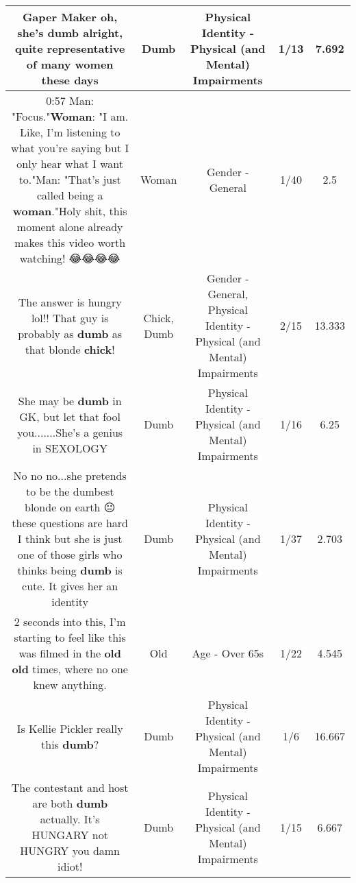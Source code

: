 \documentclass[11pt]{article}
\newlength\mylength
\begin{document}
\begin{center}
\begin{longtable}{|C{.65\mylength}|C{.30\mylength}|C{.12\mylength}|C{.12\mylength}|C{.12\mylength}|}
  \small Gaper Maker oh, she's \textbf{dumb} alright, quite representative of many women these days\normalsize   & Dumb & Physical Identity - Physical (and Mental) Impairments & 1/13 & 7.692 \\  \hline
  \small 0:57 Man: "Focus."\textbf{Woman}: "I am. Like, I'm listening to what you're saying but I only hear what I want to."Man: "That's just called being a \textbf{woman}."Holy shit, this moment alone already makes this video worth watching! 😂😂😂😂\normalsize   & Woman & Gender - General & 1/40 & 2.5 \\  \hline
  \small The answer is hungry lol!! That guy is probably as \textbf{dumb} as that blonde \textbf{chick}!\normalsize   & Chick, Dumb & Gender - General, Physical Identity - Physical (and Mental) Impairments & 2/15 & 13.333 \\  \hline
  \small She may be \textbf{dumb} in GK, but let that fool you.......She's a genius in SEXOLOGY\normalsize   & Dumb & Physical Identity - Physical (and Mental) Impairments & 1/16 & 6.25 \\  \hline
  \small No no no...she pretends to be the dumbest blonde on earth 😐 these questions are hard I think but she is just one of those girls who thinks being \textbf{dumb} is cute. It gives her an identity\normalsize   & Dumb & Physical Identity - Physical (and Mental) Impairments & 1/37 & 2.703 \\  \hline
  \small 2 seconds into this, I'm starting to feel like this was filmed in the \textbf{old} \textbf{old} times, where no one knew anything.\normalsize   & Old & Age - Over 65s & 1/22 & 4.545 \\  \hline
  \small Is Kellie Pickler really this \textbf{dumb}?\normalsize   & Dumb & Physical Identity - Physical (and Mental) Impairments & 1/6 & 16.667 \\  \hline
  \small The contestant and host are both \textbf{dumb} actually. It's HUNGARY not HUNGRY you damn idiot!\normalsize   & Dumb & Physical Identity - Physical (and Mental) Impairments & 1/15 & 6.667 \\  \hline

\end{longtable}
\end{center}
\end{document}
